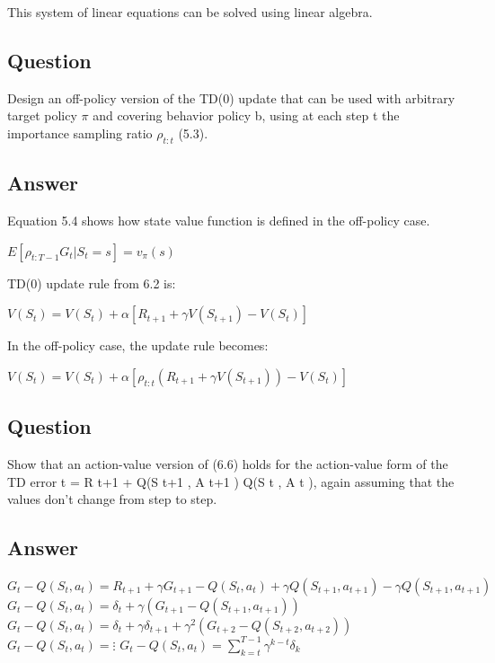 \documentclass[11pt]{article}
\begin{document}
    This system of linear equations can be solved using linear algebra.

    \subsection{Question}

    Design an off-policy version of the TD(0) update that can be used with arbitrary target policy $\pi$ and covering behavior policy b, using at each step t the importance sampling ratio $\rho_{t:t}$  (5.3).

    \subsection*{Answer}

    Equation 5.4 shows how state value function is defined in the off-policy case.

    $ E[  \rho_{t:T-1} G_{t} | S_t=s ] = v_{\pi}(s) $
    \newline

    TD(0) update rule from 6.2 is:

    $V(S_t) = V(S_t) + \alpha [ R_{t+1} + \gamma V(S_{t+1}) -V(S_t) ]  $
    \newline

    In the off-policy case, the update rule becomes:

    $V(S_t) = V(S_t) + \alpha [ \rho_{t:t} ( R_{t+1} + \gamma V(S_{t+1}) ) -V(S_t) ]  $

    \subsection{Question}

    Show that an action-value version of (6.6) holds for the action-value form of the TD error t = R t+1 + Q(S t+1 , A t+1 ) Q(S t , A t ), again assuming that the values don’t change from step to step.

    \subsection*{Answer}

    $ G_t-Q(S_t,a_t) = R_{t+1} + \gamma G_{t+1} - Q(S_t,a_t) + \gamma Q(S_{t+1},a_{t+1}) - \gamma Q(S_{t+1},a_{t+1}) $
    \newline
    $ G_t-Q(S_t,a_t) = \delta_t + \gamma (G_{t+1} - Q(S_{t+1},a_{t+1}) ) $
    \newline
    $ G_t-Q(S_t,a_t) = \delta_t + \gamma \delta_{t+1} + \gamma^2 (G_{t+2} - Q(S_{t+2},a_{t+2}) )  $
    \newline
    $ G_t-Q(S_t,a_t) = \vdots$
    \newline
    $ G_t-Q(S_t,a_t) =  \sum_{k=t}^{T-1} \gamma^{k-t} \delta_k  $
\end{document}
